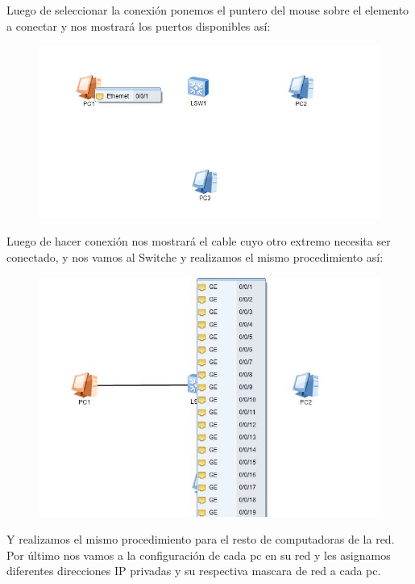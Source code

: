 \documentclass[journal]{IEEEtran}
\begin{document}
Luego de seleccionar la conexión ponemos el puntero del mouse sobre el elemento a conectar y nos mostrará los puertos disponibles así:
\begin{center}
\begin{figure}[H]
\centering
\includegraphics[scale=0.5]{6.JPG} 
\end{figure}
\end{center}
Luego de hacer conexión nos mostrará el cable cuyo otro extremo necesita ser conectado, y nos vamos al Switche y realizamos el mismo procedimiento así:
\begin{center}
\begin{figure}[H]
\centering
\includegraphics[scale=0.5]{7.JPG} 
\end{figure}
\end{center}
Y realizamos el mismo procedimiento para el resto de computadoras de la red.
Por último nos vamos a la configuración de cada pc en su red y les asignamos diferentes direcciones IP privadas y su respectiva  mascara de red a cada pc.\\
 
\end{document}
